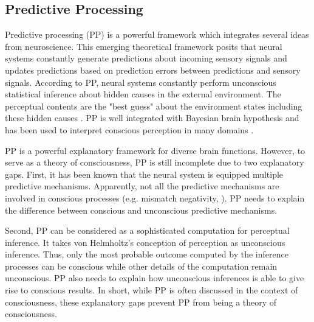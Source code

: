 \documentclass[utf8]{article}
\begin{document}
		\subsection{Predictive Processing}
    		Predictive processing (PP) is a powerful framework which integrates several ideas from neuroscience. This emerging theoretical framework posits that neural systems constantly generate predictions about incoming sensory signals and updates predictions based on prediction errors between predictions and sensory signals. According to PP, neural systems constantly perform unconscious statistical inference about hidden causes in the external environment. The perceptual contents are the "best guess" about the environment states including these hidden causes \citep{clark_2013, Hohwy2013}. PP is well integrated with Bayesian brain hypothesis and has been used to interpret conscious perception in many domains \citep{Hohwy2013, SethPP2014}.
    		
    		PP is a powerful explanatory framework for diverse brain functions. However, to serve as a theory of consciousness, PP is still incomplete due to two explanatory gaps. First, it has been known that the neural system is equipped multiple predictive mechanisms. Apparently, not all the predictive mechanisms are involved in conscious processes (e.g. mismatch negativity, \cite{naatanen2007mismatch}). PP needs to explain the difference between conscious and unconscious predictive mechanisms. 
    		
    		Second, PP can be considered as a sophisticated computation for perceptual inference. It takes von Helmholtz's conception of perception as unconscious inference. Thus, only the most probable outcome computed by the inference processes can be conscious while other details of the computation remain unconscious. PP also needs to explain how unconscious inferences is able to give rise to conscious results. In short, while PP is often discussed in the context of consciousness, these explanatory gaps prevent PP from being a theory of consciousness. 
    		
\end{document}
